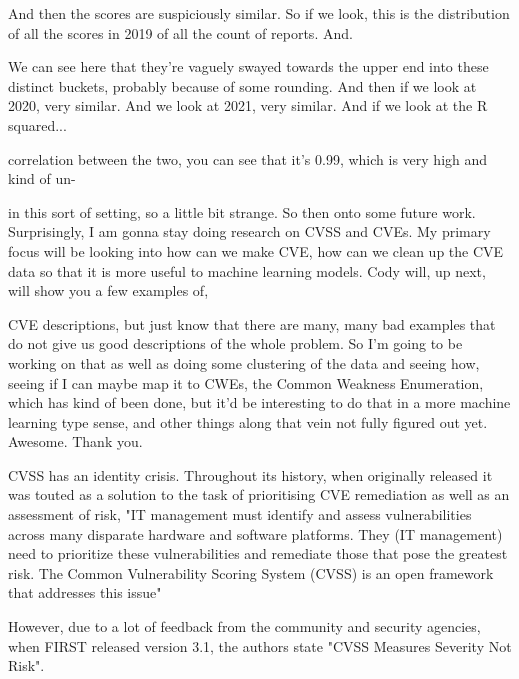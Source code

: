 \documentclass[12pt]{article}
\begin{document}
And then the scores are suspiciously similar. So if we look, this is the distribution of all the
scores in 2019 of all the count of reports. And.

We can see here that they're vaguely swayed towards the upper end into these distinct buckets,
probably because of some rounding. And then if we look at 2020, very similar. And we look at 2021,
very similar. And if we look at the R squared...

correlation between the two, you can see that it's 0.99, which is very high and kind of un-

in this sort of setting, so a little bit strange. So then onto some future work. Surprisingly, I am
gonna stay doing research on CVSS and CVEs. My primary focus will be looking into how can we make
CVE, how can we clean up the CVE data so that it is more useful to machine learning models. Cody
will, up next, will show you a few examples of,

CVE descriptions, but just know that there are many, many bad examples that do not give us good
descriptions of the whole problem. So I'm going to be working on that as well as doing some
clustering of the data and seeing how, seeing if I can maybe map it to CWEs, the Common Weakness
Enumeration, which has kind of been done, but it'd be interesting to do that in a more machine
learning type sense, and other things along that vein not fully figured out yet. Awesome. Thank you.

CVSS has an identity crisis. Throughout its history, when originally released it was touted as a
solution to the task of prioritising CVE remediation as well as an assessment of risk, "IT
management must identify and assess vulnerabilities across many disparate hardware and software
platforms. They (IT management) need to prioritize these vulnerabilities and remediate those that
pose the greatest risk. The Common Vulnerability Scoring System (CVSS) is an open framework that
addresses this issue"


However, due to a lot of feedback from the community and security agencies, when FIRST released
version 3.1, the authors state "CVSS Measures Severity Not Risk".
\end{document}
